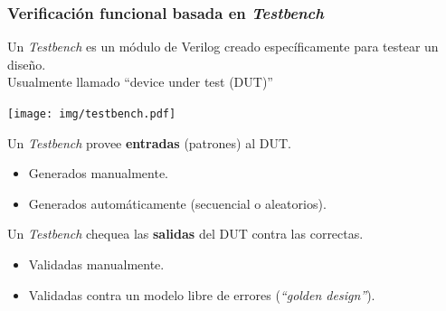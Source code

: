 \documentclass[aspectratio=169]{beamer}
\begin{document}
\begin{frame}[fragile,t]
    \frametitle{Verificación funcional basada en \emph{Testbench}}
    Un \emph{Testbench} es un módulo de Verilog creado específicamente para testear un diseño.\\
    Usualmente llamado ``device under test (DUT)''\\
    \begin{center}
    \texttt{[image: img/testbench.pdf]}
    \end{center}
    \pause
    Un \emph{Testbench} provee \textbf{entradas} (patrones) al DUT.
    \begin{itemize}
    \item Generados manualmente.
    \item Generados automáticamente (secuencial o aleatorios).
    \end{itemize}
    \bigskip
    \pause
    Un \emph{Testbench} chequea las \textbf{salidas} del DUT contra las correctas.
    \begin{itemize}
    \item Validadas manualmente.
    \item Validadas contra un modelo libre de errores (\emph{``golden design''}).
    \end{itemize}
\end{frame}
\end{document}
